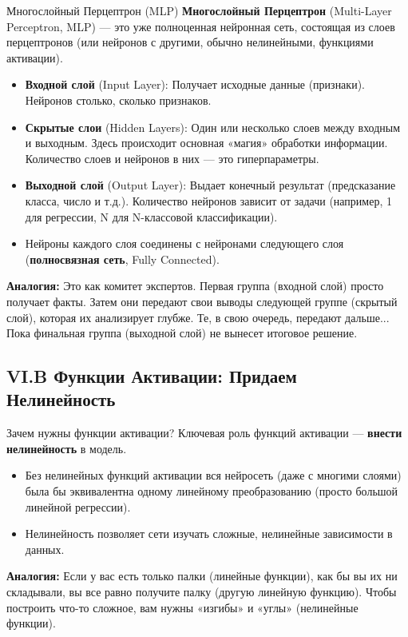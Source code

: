 \begin{myblock}{Многослойный Перцептрон (MLP)}
    \textbf{Многослойный Перцептрон} (Multi-Layer Perceptron, MLP) — это уже полноценная нейронная сеть, состоящая из слоев перцептронов (или нейронов с другими, обычно нелинейными, функциями активации).
    \begin{itemize}
        \item \textbf{Входной слой} (Input Layer): Получает исходные данные (признаки). Нейронов столько, сколько признаков.
        \item \textbf{Скрытые слои} (Hidden Layers): Один или несколько слоев между входным и выходным. Здесь происходит основная «магия» обработки информации. Количество слоев и нейронов в них — это гиперпараметры.
        \item \textbf{Выходной слой} (Output Layer): Выдает конечный результат (предсказание класса, число и т.д.). Количество нейронов зависит от задачи (например, 1 для регрессии, N для N-классовой классификации).
        \item Нейроны каждого слоя соединены с нейронами следующего слоя (\textbf{полносвязная сеть}, Fully Connected).
    \end{itemize}
    \textbf{Аналогия:} Это как комитет экспертов. Первая группа (входной слой) просто получает факты. Затем они передают свои выводы следующей группе (скрытый слой), которая их анализирует глубже. Те, в свою очередь, передают дальше... Пока финальная группа (выходной слой) не вынесет итоговое решение.
\end{myblock}

\subsection{VI.B Функции Активации: Придаем Нелинейность}

\begin{alerttextbox}{Зачем нужны функции активации?}
    Ключевая роль функций активации — \textbf{внести нелинейность} в модель.
    \begin{itemize}
        \item Без нелинейных функций активации вся нейросеть (даже с многими слоями) была бы эквивалентна одному линейному преобразованию (просто большой линейной регрессии).
        \item Нелинейность позволяет сети изучать сложные, нелинейные зависимости в данных.
    \end{itemize}
    \textbf{Аналогия:} Если у вас есть только палки (линейные функции), как бы вы их ни складывали, вы все равно получите палку (другую линейную функцию). Чтобы построить что-то сложное, вам нужны «изгибы» и «углы» (нелинейные функции).
\end{alerttextbox}

